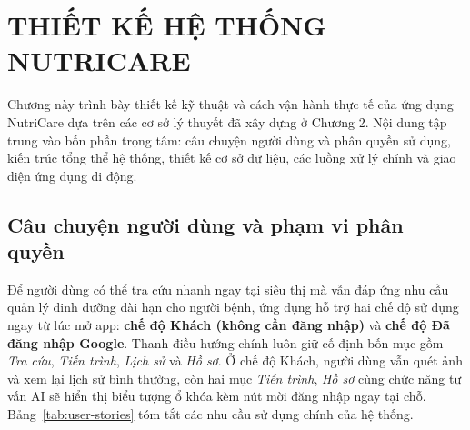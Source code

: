 \chapter{THIẾT KẾ HỆ THỐNG NUTRICARE}

Chương này trình bày thiết kế kỹ thuật và cách vận hành thực tế của ứng dụng NutriCare dựa trên các cơ sở lý thuyết đã xây dựng ở Chương 2. Nội dung tập trung vào bốn phần trọng tâm: câu chuyện người dùng và phân quyền sử dụng, kiến trúc tổng thể hệ thống, thiết kế cơ sở dữ liệu, các luồng xử lý chính và giao diện ứng dụng di động.

\section{Câu chuyện người dùng và phạm vi phân quyền}
\label{sec:user-stories}

Để người dùng có thể tra cứu nhanh ngay tại siêu thị mà vẫn đáp ứng nhu cầu quản lý dinh dưỡng dài hạn cho người bệnh, ứng dụng hỗ trợ hai chế độ sử dụng ngay từ lúc mở app: \textbf{chế độ Khách (không cần đăng nhập)} và \textbf{chế độ Đã đăng nhập Google}. Thanh điều hướng chính luôn giữ cố định bốn mục gồm \textit{Tra cứu}, \textit{Tiến trình}, \textit{Lịch sử} và \textit{Hồ sơ}. Ở chế độ Khách, người dùng vẫn quét ảnh và xem lại lịch sử bình thường, còn hai mục \textit{Tiến trình}, \textit{Hồ sơ} cùng chức năng tư vấn AI sẽ hiển thị biểu tượng ổ khóa kèm nút mời đăng nhập ngay tại chỗ. Bảng~\ref{tab:user-stories} tóm tắt các nhu cầu sử dụng chính của hệ thống.

